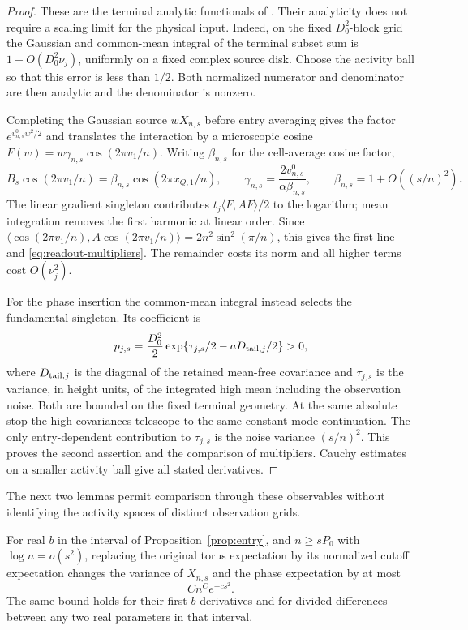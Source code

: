 \begin{proof}
These are the terminal analytic functionals of
\cite[Equations~(97)--(98), (116)--(119), and (130)]{F}.
Their analyticity does not require a scaling limit for the physical
input.  Indeed, on the fixed $D_0^2$-block grid the Gaussian and common-mean
integral of the terminal subset sum is $1+O(D_0^2\nu_j)$, uniformly
on a fixed complex source disk.
Choose the activity ball so that this error is less than $1/2$.
Both normalized numerator and denominator are then analytic and the
denominator is nonzero.

Completing the Gaussian source $wX_{n,s}$ before entry averaging gives
the factor $e^{v^0_{n,s}w^2/2}$ and translates the interaction by a
microscopic cosine $F(w)=w\gamma_{n,s}\cos(2\pi v_1/n)$.
Writing $\beta_{n,s}$ for the cell-average cosine factor,
\[
 B_s\cos(2\pi v_1/n)=\beta_{n,s}\cos(2\pi x_{Q,1}/n),\qquad
 \gamma_{n,s}=\frac{2v^0_{n,s}}{\alpha\beta_{n,s}},\qquad
 \beta_{n,s}=1+O((s/n)^2).
\]
The linear gradient singleton contributes
$t_j\langle F,AF\rangle/2$ to the logarithm; mean integration removes
the first harmonic at linear order.  Since
$\langle\cos(2\pi v_1/n),A\cos(2\pi v_1/n)\rangle
=2n^2\sin^2(\pi/n)$, this gives the first line and
\eqref{eq:readout-multipliers}.  The remainder costs its norm and all
higher terms cost $O(\nu_j^2)$.

For the phase insertion the common-mean integral instead selects the
fundamental singleton.  Its coefficient is
\[
 p_{j,s}=\frac{D_0^2}{2}
           \exp\{\tau_{j,s}/2-aD_{{\rm tail},j}/2\}>0,
\]
where $D_{{\rm tail},j}$ is the diagonal of the retained mean-free
covariance and $\tau_{j,s}$ is the variance, in height units, of the
integrated high mean including the observation noise.  Both are bounded
on the fixed terminal geometry.  At the same absolute stop the high
covariances telescope to the same constant-mode continuation.  The only
entry-dependent contribution to $\tau_{j,s}$ is the noise variance
$(s/n)^2$.  This proves the second assertion and the comparison of
multipliers.  Cauchy estimates on a smaller activity ball give all
stated derivatives.
\end{proof}

The next two lemmas permit comparison through these observables without
identifying the activity spaces of distinct observation grids.

\begin{lemma}\label{lem:cutoff-derivative}
For real $b$ in the interval of Proposition~\ref{prop:entry}, and
$n\ge sP_0$ with $\log n=o(s^2)$, replacing the original torus
expectation by its normalized cutoff expectation changes the variance
of $X_{n,s}$ and the phase expectation by at most
\begin{equation}\label{eq:cutoff-derivative-error}
                                Cn^Ce^{-cs^2}.
\end{equation}
The same bound holds for their first $b$ derivatives and for divided
differences between any two real parameters in that interval.
\end{lemma}

